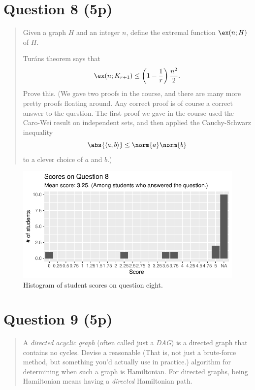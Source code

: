 \documentclass[nobib]{tufte-handout}
\begin{document}
\section{Question 8 (5p)} %

\begin{quotation}
  Given a graph $H$ and an integer $n$, define the extremal function $\ex(n; H)$ of $H$.

  Turáns theorem says that
  $$\ex(n; K_{r+1}) \leq \left(1 - \frac{1}{r}\right)\frac{n^2}{2}.$$
  Prove this. (We gave two proofs in the course, and there are many more pretty proofs floating around. Any correct proof is of course a correct answer to the question. The first proof we gave in the course used the Caro-Wei result on independent sets, and then applied the Cauchy-Schwarz inequality
  $$\abs{\langle a, b \rangle} \leq \norm{a}\norm{b}$$
  to a clever choice of $a$ and $b$.)
\end{quotation}

\begin{figure}
  \centering
  \includegraphics[width = \textwidth]{Q8.pdf}
  \caption[Score histogram for Q8]{Histogram of student scores on question eight.}
  \label{fig:Q8}
\end{figure}

\section{Question 9 (5p)} %

\begin{quotation}
  A \emph{directed acyclic graph} (often called just a \emph{DAG}) is a directed graph that contains no cycles. Devise a reasonable (That is, not just a brute-force method, but something you'd actually use in practice.) algorithm for determining when such a graph is Hamiltonian. For directed graphs, being Hamiltonian means having a \emph{directed} Hamiltonian path.
\end{quotation}
\end{document}
